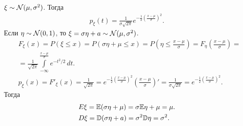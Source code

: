 \documentclass[../main.tex]{subfiles}
\begin{document}
\begin{exmpl}
 $ \xi \sim \mathcal N(\mu,\sigma^{2}) $. Тогда
 \begin{align*}
  p_\xi(t) = \frac{1}{\sigma\sqrt{2\pi}} e^{-\frac{1}{2} \left( \frac{x-\mu}{\sigma} \right)^{2}}.
 \end{align*} Если $ \eta \sim \mathcal N(0,1) $, то $ \xi = \sigma \eta + a \sim \mathcal N(\mu,\sigma^{2}) $.
\begin{align*}
 &F_\xi(x) = P(\xi \leqslant x) = P(\sigma\eta + \mu \leqslant x) = P\left(\eta \leqslant \frac{x-\mu}{\sigma}\right) = F_{\eta}\left( \frac{x-\mu}{\sigma} \right) = \\
 &= \frac{1}{\sqrt{2\pi}} \int\limits_{-\infty}^{\frac{x-\mu}{\sigma}} e^{-t^{2} / 2}\,dt. \\
 &p_\xi(x) = F'_\xi(x) = \frac{1}{\sqrt{2\pi}} = e^{-\frac{1}{2} \left( \frac{x-\mu}{\sigma} \right)^{2}} \left( \frac{x-\mu}{\sigma} \right)' = \frac{1}{\sigma\sqrt{2\pi}} = e^{-\frac{1}{2} \left( \frac{x-\mu}{\sigma} \right)^{2}}.
\end{align*} Тогда
\begin{align*}
 &E\xi = \mathbb E(\sigma \eta + \mu)  = \sigma \mathbb E\eta + \mu = \mu.\\
 &D\xi = \mathbb D(\sigma\eta + a) = \sigma^{2}\mathbb D\eta = \sigma^{2}.
\end{align*} 
\end{exmpl}
\end{document}
